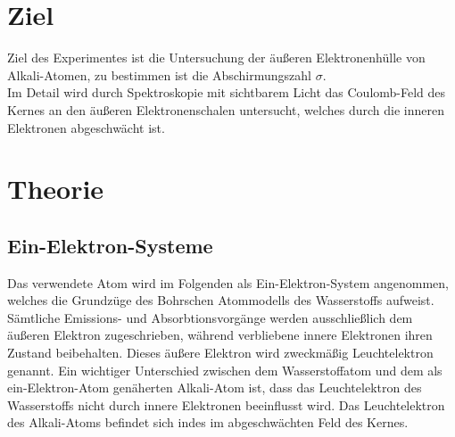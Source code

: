\section*{Ziel}
Ziel des Experimentes ist die Untersuchung der äußeren Elektronenhülle von Alkali-Atomen, zu bestimmen ist die Abschirmungszahl $\sigma$.\\
Im Detail wird durch Spektroskopie mit sichtbarem Licht das Coulomb-Feld des Kernes an den äußeren Elektronenschalen untersucht,
welches durch die inneren Elektronen abgeschwächt ist.

\section{Theorie}
\label{sec:Theorie}
\subsection{Ein-Elektron-Systeme} %
\label{sub:1e}
Das verwendete Atom wird im Folgenden als Ein-Elektron-System angenommen, welches die Grundzüge des Bohrschen Atommodells des Wasserstoffs aufweist.
Sämtliche Emissions- und Absorbtionsvorgänge werden ausschließlich dem äußeren Elektron zugeschrieben, während verbliebene innere Elektronen ihren Zustand beibehalten.
Dieses äußere Elektron wird zweckmäßig Leuchtelektron genannt.
Ein wichtiger Unterschied zwischen dem Wasserstoffatom und dem als ein-Elektron-Atom genäherten Alkali-Atom ist, dass das Leuchtelektron des Wasserstoffs nicht durch innere Elektronen beeinflusst wird.
Das Leuchtelektron des Alkali-Atoms befindet sich indes im abgeschwächten Feld des Kernes.
